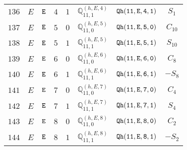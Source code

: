 \documentclass[fleqn,8pt]{jsarticle}
\begin{document}
\begin{table}[ht!]
\begin{center}
\begin{tabular}{cccccccc}
$ 136 $ & $ E $ & $ {\tt E} $ & $ 4 $ & $ 1 $ & $ \mathbb{Q}_{11,1}^{(h,E,4)} $ & $ {\tt Qh(11,E,4,1)} $ & $ S_{1} $ \\
$ 137 $ & $ E $ & $ {\tt E} $ & $ 5 $ & $ 0 $ & $ \mathbb{Q}_{11,0}^{(h,E,5)} $ & $ {\tt Qh(11,E,5,0)} $ & $ C_{10} $ \\
$ 138 $ & $ E $ & $ {\tt E} $ & $ 5 $ & $ 1 $ & $ \mathbb{Q}_{11,1}^{(h,E,5)} $ & $ {\tt Qh(11,E,5,1)} $ & $ S_{10} $ \\
$ 139 $ & $ E $ & $ {\tt E} $ & $ 6 $ & $ 0 $ & $ \mathbb{Q}_{11,0}^{(h,E,6)} $ & $ {\tt Qh(11,E,6,0)} $ & $ C_{8} $ \\
$ 140 $ & $ E $ & $ {\tt E} $ & $ 6 $ & $ 1 $ & $ \mathbb{Q}_{11,1}^{(h,E,6)} $ & $ {\tt Qh(11,E,6,1)} $ & $ - S_{8} $ \\
$ 141 $ & $ E $ & $ {\tt E} $ & $ 7 $ & $ 0 $ & $ \mathbb{Q}_{11,0}^{(h,E,7)} $ & $ {\tt Qh(11,E,7,0)} $ & $ C_{4} $ \\
$ 142 $ & $ E $ & $ {\tt E} $ & $ 7 $ & $ 1 $ & $ \mathbb{Q}_{11,1}^{(h,E,7)} $ & $ {\tt Qh(11,E,7,1)} $ & $ S_{4} $ \\
$ 143 $ & $ E $ & $ {\tt E} $ & $ 8 $ & $ 0 $ & $ \mathbb{Q}_{11,0}^{(h,E,8)} $ & $ {\tt Qh(11,E,8,0)} $ & $ C_{2} $ \\
$ 144 $ & $ E $ & $ {\tt E} $ & $ 8 $ & $ 1 $ & $ \mathbb{Q}_{11,1}^{(h,E,8)} $ & $ {\tt Qh(11,E,8,1)} $ & $ - S_{2} $ \\
 \hline \hline
\end{tabular}
\end{center}
\end{table}
\end{document}
